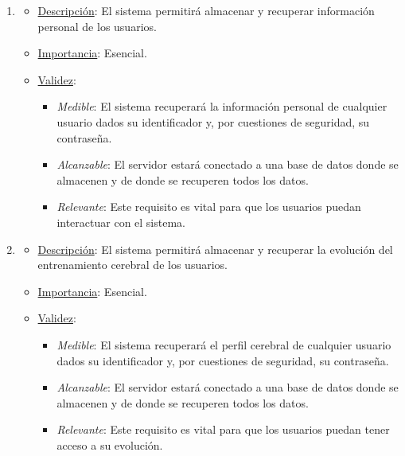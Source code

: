 \begin{enumerate}
\item %
  \begin{itemize}
  \item \underline{Descripción}: El sistema permitirá almacenar y recuperar información personal de los usuarios.
  \item \underline{Importancia}: Esencial.
  \item \underline{Validez}:
    \begin{itemize}
    \item \textit{Medible}: El sistema recuperará la información personal de cualquier usuario dados su identificador y, por cuestiones de seguridad, su contraseña.
    \item \textit{Alcanzable}: El servidor estará conectado a una base de datos donde se almacenen y de donde se recuperen todos los datos.
    \item \textit{Relevante}: Este requisito es vital para que los usuarios puedan interactuar con el sistema.
    \end{itemize}
  \end{itemize}

\item %
  \begin{itemize}
  \item \underline{Descripción}: El sistema permitirá almacenar y recuperar la evolución del entrenamiento cerebral de los usuarios.
  \item \underline{Importancia}: Esencial.
  \item \underline{Validez}:
    \begin{itemize}
    \item \textit{Medible}: El sistema recuperará el perfil cerebral de cualquier usuario dados su identificador y, por cuestiones de seguridad, su contraseña.
    \item \textit{Alcanzable}: El servidor estará conectado a una base de datos donde se almacenen y de donde se recuperen todos los datos.
    \item \textit{Relevante}: Este requisito es vital para que los usuarios puedan tener acceso a su evolución.
    \end{itemize}
  \end{itemize}


\end{enumerate}
